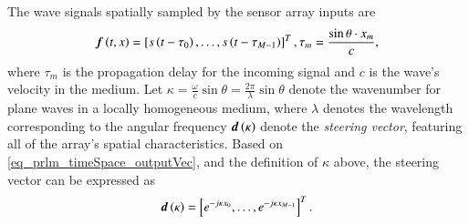 The wave signals spatially sampled by the sensor array inputs are
\begin{equation}
\label{eq_prlm_timeSpace_outputVec}
\boldsymbol{f}\left({t,x}\right) = \left[{s\left({t-\tau_{0}}\right), \dots, s\left({t-\tau_{M-1}}\right)}\right]^{T}, \tau_{m} = \frac{\sin{\theta}\cdot{}x_{m}}{c},
\end{equation}
where $\tau_{m}$ is the propagation delay for the incoming signal and $c$ is the wave's velocity in the medium.
Let $\kappa=\frac{\omega}{c}\sin{\theta}=\frac{2\pi}{\lambda}\sin{\theta}$ denote the wavenumber for plane waves in a locally homogeneous medium, where $\lambda$ denotes the wavelength corresponding to the angular frequency $\boldsymbol{d}\left({\kappa}\right)$ denote the \emph{steering vector}, featuring all of the array's spatial characteristics.
Based on \eqref{eq_prlm_timeSpace_outputVec}, and the definition of $\kappa$ above, the steering vector can be expressed as
\begin{equation}
\boldsymbol{d}\left({\kappa}\right)=\left[{e^{-j\kappa{}x_{0}},\dots,e^{-j\kappa{}x_{M-1}}}\right]^{T}.
\end{equation}